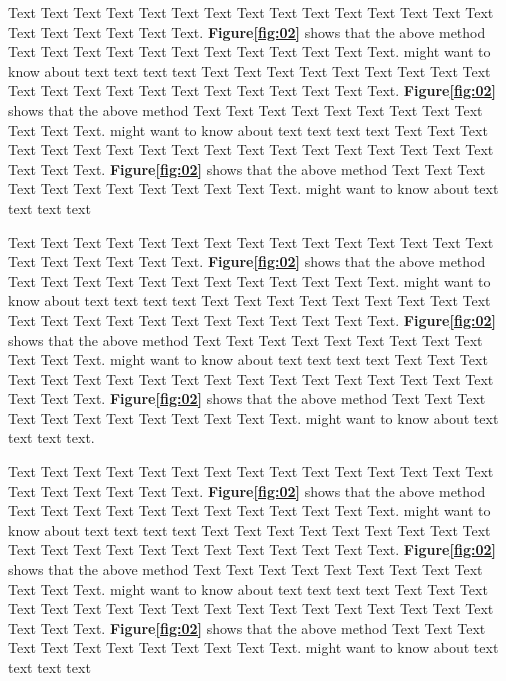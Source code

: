 \documentclass{bioinfo}
\begin{document}
\begin{methods}
Text Text Text Text Text Text  Text Text Text Text Text Text Text Text Text  Text Text Text Text Text Text. \textbf{Figure\ref{fig:02}} shows that the above method  Text Text Text Text  Text Text Text Text Text Text  Text Text.  \citealp{Boffelli03} might want to know about  text text text text
Text Text Text Text Text Text  Text Text Text Text Text Text Text Text Text  Text Text Text Text Text Text. \textbf{Figure\ref{fig:02}} shows that the above method  Text Text Text Text  Text Text Text Text Text Text  Text Text.  \citealp{Boffelli03} might want to know about  text text text text
Text Text Text Text Text Text  Text Text Text Text Text Text Text Text Text  Text Text Text Text Text Text. \textbf{Figure\ref{fig:02}} shows that the above method  Text Text Text Text  Text Text Text Text Text Text  Text Text.  \citealp{Boffelli03} might want to know about  text text text text



Text Text Text Text Text Text  Text Text Text Text Text Text Text Text Text  Text Text Text Text Text Text. \textbf{Figure\ref{fig:02}} shows that the above method  Text Text Text Text  Text Text Text Text Text Text  Text Text.  \citealp{Boffelli03} might want to know about  text text text text
Text Text Text Text Text Text  Text Text Text Text Text Text Text Text Text  Text Text Text Text Text Text. \textbf{Figure\ref{fig:02}} shows that the above method  Text Text Text Text  Text Text Text Text Text Text  Text Text.  \citealp{Boffelli03} might want to know about  text text text text
Text Text Text Text Text Text  Text Text Text Text Text Text Text Text Text  Text Text Text Text Text Text. \textbf{Figure\ref{fig:02}} shows that the above method  Text Text Text Text  Text Text Text Text Text Text  Text Text.  \citealp{Boffelli03} might want to know about  text text text text.


Text Text Text Text Text Text  Text Text Text Text Text Text Text Text Text  Text Text Text Text Text Text. \textbf{Figure\ref{fig:02}} shows that the above method  Text Text Text Text  Text Text Text Text Text Text  Text Text.  \citealp{Boffelli03} might want to know about  text text text text
Text Text Text Text Text Text  Text Text Text Text Text Text Text Text Text  Text Text Text Text Text Text. \textbf{Figure\ref{fig:02}} shows that the above method  Text Text Text Text  Text Text Text Text Text Text  Text Text.  \citealp{Boffelli03} might want to know about  text text text text
Text Text Text Text Text Text  Text Text Text Text Text Text Text Text Text  Text Text Text Text Text Text. \textbf{Figure\ref{fig:02}} shows that the above method  Text Text Text Text  Text Text Text Text Text Text  Text Text.  \citealp{Boffelli03} might want to know about  text text text text




\end{methods}
\end{document}
